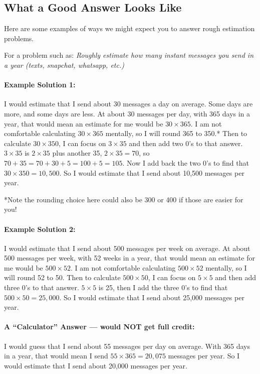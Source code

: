 \documentclass[12pt]{ximera}
\begin{document}
\subsection*{What a Good Answer Looks Like}

Here are some examples of ways we might expect you to answer rough estimation problems.

For a problem such as: \textit{Roughly estimate how many instant messages you send in a
year (texts, snapchat, whatsapp, etc.)}

\paragraph{Example Solution 1:}
I would estimate that I send about 30 messages a day on average. Some days are more,
and some days are less. At about 30 messages per day, with 365 days in a year, that
would mean an estimate for me would be $30 \times 365$. I am not comfortable
calculating $30 \times 365$ mentally, so I will round 365 to 350.* Then to calculate
$30 \times 350$, I can focus on $3 \times 35$ and then add two 0's to that answer.
$3 \times 35$ is $2 \times 35$ plus another 35, $2 \times 35 = 70$, so
$70 + 35 = 70 + 30 + 5 = 100 + 5 = 105$. Now I add back the two 0's to find that
$30 \times 350 = 10{,}500$. So I would estimate that I send about 10,500 messages per
year.

*Note the rounding choice here could also be 300 or 400 if those are easier for you!

\paragraph{Example Solution 2:}
I would estimate that I send about 500 messages per week on average. At about 500
messages per week, with 52 weeks in a year, that would mean an estimate for me would be
$500 \times 52$. I am not comfortable calculating $500 \times 52$ mentally, so I will
round 52 to 50. Then to calculate $500 \times 50$, I can focus on $5 \times 5$ and then
add three 0's to that answer. $5 \times 5$ is 25, then I add the three 0's to find that
$500 \times 50 = 25{,}000$. So I would estimate that I send about 25,000 messages per
year.

\paragraph{A ``Calculator'' Answer --- would NOT get full credit:}
I would guess that I send about 55 messages per day on average. With 365 days in a
year, that would mean I send $55 \times 365 = 20{,}075$ messages per year. So I would
estimate that I send about 20,000 messages per year.
\end{document}
